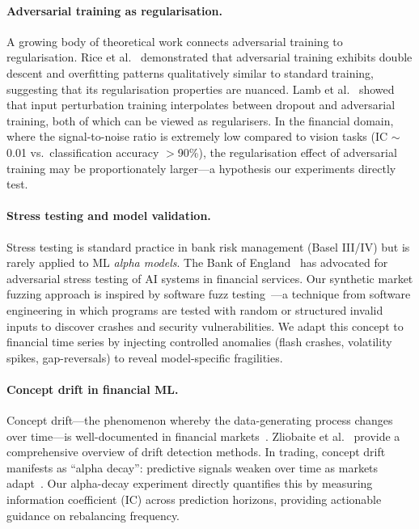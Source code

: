 \documentclass[preprint,review,12pt]{elsarticle}
\begin{document}
\paragraph{Adversarial training as regularisation.}
A growing body of theoretical work connects adversarial training to regularisation.
Rice et al.~\citep{ref_rice2020} demonstrated that adversarial training exhibits double descent and overfitting patterns qualitatively similar to standard training, suggesting that its regularisation properties are nuanced.
Lamb et al.~\citep{ref_lamb2019} showed that input perturbation training interpolates between dropout and adversarial training, both of which can be viewed as regularisers.
In the financial domain, where the signal-to-noise ratio is extremely low compared to vision tasks (IC $\sim$ 0.01 vs.\ classification accuracy $>$90\%), the regularisation effect of adversarial training may be proportionately larger---a hypothesis our experiments directly test.

\paragraph{Stress testing and model validation.}
Stress testing is standard practice in bank risk management (Basel III/IV) but is rarely applied to ML \emph{alpha models}.
The Bank of England~\citep{ref_boe2019} has advocated for adversarial stress testing of AI systems in financial services.
Our synthetic market fuzzing approach is inspired by software fuzz testing~\citep{ref_miller1990}---a technique from software engineering in which programs are tested with random or structured invalid inputs to discover crashes and security vulnerabilities.
We adapt this concept to financial time series by injecting controlled anomalies (flash crashes, volatility spikes, gap-reversals) to reveal model-specific fragilities.

\paragraph{Concept drift in financial ML.}
Concept drift---the phenomenon whereby the data-generating process changes over time---is well-documented in financial markets~\citep{ref14}.
Zliobaite et al.~\citep{ref_zliobaite2016} provide a comprehensive overview of drift detection methods.
In trading, concept drift manifests as ``alpha decay'': predictive signals weaken over time as markets adapt~\citep{ref42}.
Our alpha-decay experiment directly quantifies this by measuring information coefficient (IC) across prediction horizons, providing actionable guidance on rebalancing frequency.
\end{document}

